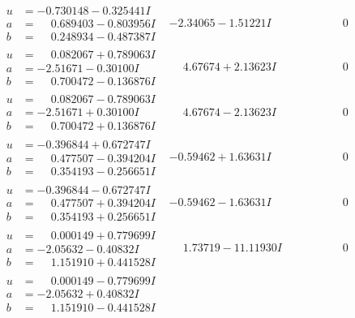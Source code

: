 \documentclass[1p]{elsarticle_modified}
\theoremstyle{definition}
\begin{document}
$$\begin{array}{c|c|c}
\begin{aligned}
u &= -0.730148 - 0.325441 I \\
a &= \phantom{-}0.689403 - 0.803956 I \\
b &= \phantom{-}0.248934 - 0.487387 I\end{aligned}
 & -2.34065 - 1.51221 I & \phantom{-0.000000 } 0 \\ \hline\begin{aligned}
u &= \phantom{-}0.082067 + 0.789063 I \\
a &= -2.51671 - 0.30100 I \\
b &= \phantom{-}0.700472 - 0.136876 I\end{aligned}
 & \phantom{-}4.67674 + 2.13623 I & \phantom{-0.000000 } 0 \\ \hline\begin{aligned}
u &= \phantom{-}0.082067 - 0.789063 I \\
a &= -2.51671 + 0.30100 I \\
b &= \phantom{-}0.700472 + 0.136876 I\end{aligned}
 & \phantom{-}4.67674 - 2.13623 I & \phantom{-0.000000 } 0 \\ \hline\begin{aligned}
u &= -0.396844 + 0.672747 I \\
a &= \phantom{-}0.477507 - 0.394204 I \\
b &= \phantom{-}0.354193 - 0.256651 I\end{aligned}
 & -0.59462 + 1.63631 I & \phantom{-0.000000 } 0 \\ \hline\begin{aligned}
u &= -0.396844 - 0.672747 I \\
a &= \phantom{-}0.477507 + 0.394204 I \\
b &= \phantom{-}0.354193 + 0.256651 I\end{aligned}
 & -0.59462 - 1.63631 I & \phantom{-0.000000 } 0 \\ \hline\begin{aligned}
u &= \phantom{-}0.000149 + 0.779699 I \\
a &= -2.05632 - 0.40832 I \\
b &= \phantom{-}1.151910 + 0.441528 I\end{aligned}
 & \phantom{-}1.73719 - 11.11930 I & \phantom{-0.000000 } 0 \\ \hline\begin{aligned}
u &= \phantom{-}0.000149 - 0.779699 I \\
a &= -2.05632 + 0.40832 I \\
b &= \phantom{-}1.151910 - 0.441528 I\end{aligned}

\end{array}$$
\end{document}
